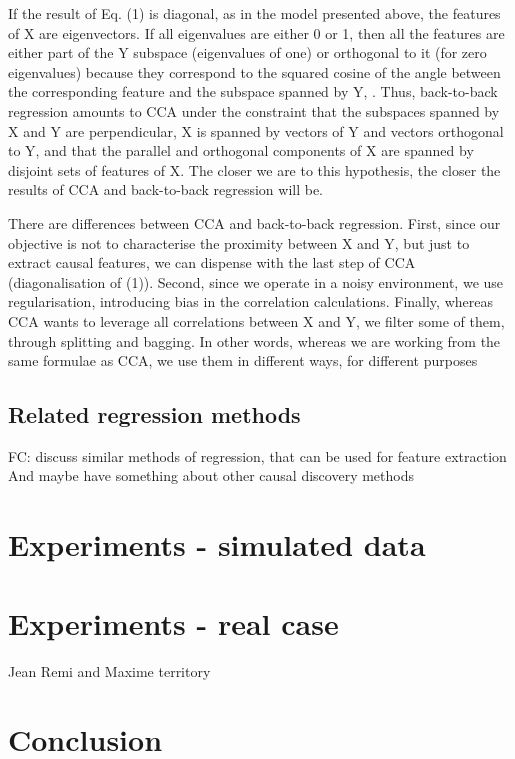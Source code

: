 \documentclass{article}
\begin{document}
If the result of Eq. (1) is diagonal, as in the model presented above, the features of X are eigenvectors.
%
If all eigenvalues are either 0 or 1, then all the features are either part of the Y subspace (eigenvalues of one) or orthogonal to it (for zero eigenvalues) because they correspond to the squared cosine of the angle between the corresponding feature and the subspace spanned by Y, .
%
Thus, back-to-back regression amounts to CCA under the constraint that the subspaces spanned by X and Y are perpendicular, X is spanned by vectors of Y and vectors orthogonal to Y, and that the parallel and orthogonal components of X are spanned by disjoint sets of features of X.
%
The closer we are to this hypothesis, the closer the results of CCA and back-to-back regression will be.

There are differences between CCA and back-to-back regression.
%
First, since our objective is not to characterise the proximity between X and Y, but just to extract causal features, we can dispense with the last step of CCA (diagonalisation of (1)).
%
Second, since we operate in a noisy environment, we use regularisation, introducing bias in the correlation calculations.
%
Finally, whereas CCA wants to leverage all correlations between X and Y, we filter some of them, through splitting and bagging.
%
In other words, whereas we are working from the same formulae as CCA, we use them in different ways, for different purposes

\subsection{Related regression methods}
FC: discuss similar methods of regression, that can be used for feature extraction
And maybe have something about other causal discovery methods

\section{Experiments - simulated data}


\section{Experiments - real case}
Jean Remi and Maxime territory



\section{Conclusion}
\end{document}
